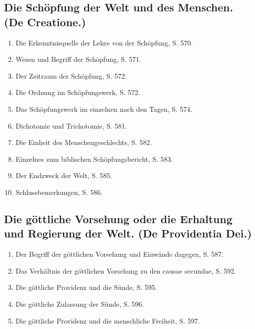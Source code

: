 \subsection*{\textbf{Die Schöpfung der Welt und des Menschen. (De Creatione.)}}
\begin{enumerate}
  \item Die Erkenntnisquelle der Lehre von der Schöpfung, S. 570.
  \item Wesen und Begriff der Schöpfung, S. 571.
  \item Der Zeitraum der Schöpfung, S. 572.
  \item Die Ordnung im Schöpfungswerk, S. 572.
  \item Das Schöpfungswerk im einzelnen nach den Tagen, S. 574.
  \item Dichotomie und Trichotomie, S. 581.
  \item Die Einheit des Menschengeschlechts, S. 582.
  \item Einzelnes zum biblischen Schöpfungsbericht, S. 583.
  \item Der Endzweck der Welt, S. 585.
  \item Schlussbemerkungen, S. 586.
\end{enumerate}

\subsection*{\textbf{Die göttliche Vorsehung oder die Erhaltung und Regierung der Welt. (De Providentia Dei.)}}
\begin{enumerate}
  \item Der Begriff der göttlichen Vorsehung und Einwände dagegen, S. 587.
  \item Das Verhältnis der göttlichen Vorsehung zu den causae secundae, S. 592.
  \item Die göttliche Providenz und die Sünde, S. 595.
  \item Die göttliche Zulassung der Sünde, S. 596.
  \item Die göttliche Providenz und die menschliche Freiheit, S. 597.
\end{enumerate}